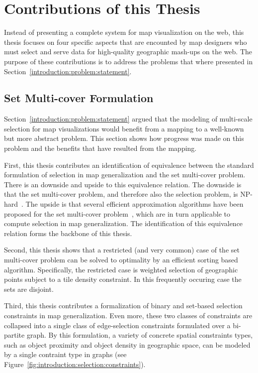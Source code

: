 \documentclass[11pt, oneside]{report}
\begin{document}
\section{Contributions of this Thesis}
\label{sec:introduction:contributions}

Instead of presenting a complete system for map visualization on the web, this thesis focuses on four specific aspects that are encounted by map designers who must select and serve data for high-quality geographic mash-ups on the web. The purpose of these  contributions is to address the problems that where presented in Section~\ref{introduction:problem:statement}.
 
\subsection{Set Multi-cover Formulation}
\label{sec:introduction:contributions:set:multicover:problem}

Section~\ref{introduction:problem:statement} argued that the modeling of multi-scale selection for map visualizations would benefit from a mapping to a well-known but more abstract problem. This section shows how progress was made on this problem and the benefits that have resulted from the mapping.

First, this thesis contributes an identification of equivalence between the standard formulation of selection in map generalization and the set multi-cover problem. There is an downside and upside to this equivalence relation. The downside is that the set multi-cover problem, and therefore also the selection problem, is NP-hard~\cite{vazirani2001approximation}. The upside is that several efficient approximation algorithms have been proposed for the set multi-cover problem~\cite{chekuri2012setmulticover,rajagopalan1998primal}, which are in turn applicable to compute selection in map generalization. The identification of this equivalence relation forms the backbone of this thesis.

Second, this thesis shows that a restricted (and very common) case of the set multi-cover problem can be solved to optimality by an efficient sorting based algorithm. Specifically, the restricted case is weighted selection of geographic points subject to a tile density constraint. In this frequently occuring case the sets are disjoint.

Third, this thesis contributes a formalization of binary and set-based selection constraints in map generalization. Even more, these two classes of constraints are collapsed into a single class of edge-selection constraints formulated over a bi-partite graph. By this formulation, a variety of concrete spatial constraints types, such as object proximity and object density in geographic space, can be modeled by a single contraint type in graphs (see Figure~\ref{fig:introduction:selection:constraints}).
\end{document}
